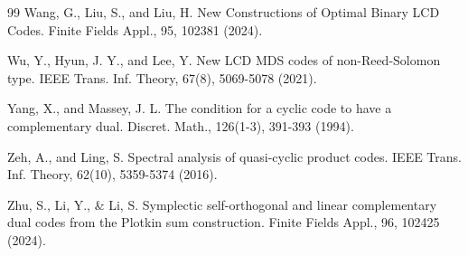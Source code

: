 \documentclass[a4paper,12pt]{article}
\begin{document}
\begin{thebibliography}{99}
 Wang, G., Liu, S., and Liu, H. New Constructions of Optimal Binary LCD Codes. Finite Fields Appl.,  95, 102381 (2024).

Wu, Y., Hyun, J. Y., and  Lee, Y. New LCD MDS codes of non-Reed-Solomon type. 
IEEE Trans. Inf. Theory, 67(8), 5069-5078  (2021).

 Yang, X., and Massey, J. L.  The condition for a cyclic code to have a complementary dual. Discret. Math., 126(1-3), 391-393 (1994).

Zeh, A., and Ling, S. Spectral analysis of quasi-cyclic product codes. IEEE Trans. Inf. Theory, 62(10), 5359-5374  (2016). 

Zhu, S., Li, Y., \& Li, S. Symplectic self-orthogonal and linear complementary dual codes from the Plotkin sum construction. 
Finite Fields Appl.,  96, 102425  (2024). 



\end{thebibliography} 
\end{document}
